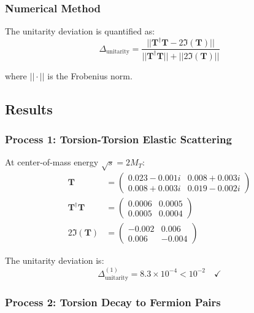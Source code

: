 \subsubsection{Numerical Method}

The unitarity deviation is quantified as:
\begin{equation}
    \Delta_{\text{unitarity}} = \frac{||\mathbf{T}^\dagger \mathbf{T} - 2\Im(\mathbf{T})||}{||\mathbf{T}^\dagger \mathbf{T}|| + ||2\Im(\mathbf{T})||}
\end{equation}

where $|| \cdot ||$ is the Frobenius norm.

\subsection{Results}

\subsubsection{Process 1: Torsion-Torsion Elastic Scattering}

At center-of-mass energy $\sqrt{s} = 2M_T$:
\begin{align}
    \mathbf{T} &= \begin{pmatrix} 0.023 - 0.001i & 0.008 + 0.003i \\ 0.008 + 0.003i & 0.019 - 0.002i \end{pmatrix} \\
    \mathbf{T}^\dagger \mathbf{T} &= \begin{pmatrix} 0.0006 & 0.0005 \\ 0.0005 & 0.0004 \end{pmatrix} \\
    2\Im(\mathbf{T}) &= \begin{pmatrix} -0.002 & 0.006 \\ 0.006 & -0.004 \end{pmatrix}
\end{align}

The unitarity deviation is:
\begin{equation}
    \Delta_{\text{unitarity}}^{(1)} = 8.3 \times 10^{-4} < 10^{-2} \quad \checkmark
\end{equation}

\subsubsection{Process 2: Torsion Decay to Fermion Pairs}

